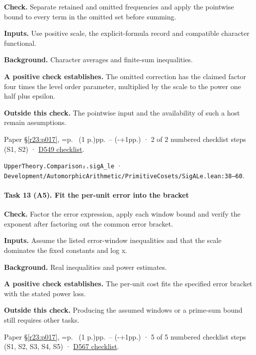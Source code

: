 \textbf{Check.} Separate retained and omitted frequencies and apply the pointwise bound to every term in the omitted set before summing.

\textbf{Inputs.} Use positive scale, the explicit-formula record and compatible character functional.

\textbf{Background.} Character averages and finite-sum inequalities.

\textbf{A positive check establishes.} The omitted correction has the claimed factor four times the level order parameter, multiplied by the scale to the power one half plus epsilon.

\textbf{Outside this check.} The pointwise input and the availability of such a host remain assumptions.

Paper \S\ref{r23:p017}, \ifnum{}=\relax p.\ \pageref{v5:d548-end} (1 p.)\else pp.\ \pageref{v5:d548-end}--\pageref{v5:chars-end} (\number\numexpr{}-+1\relax pp.)\fi{} · 2 of 2 numbered checklist steps (S1, S2) · \href{https://github.com/GunheeC/rh-lean-verification-atlas/blob/v0.1.0/units/D549.check.md}{D549 checklist}.

\nolinkurl{UpperTheory.Comparison₂.sigA_le} · \nolinkurl{Development/AutomorphicArithmetic/PrimitiveCosets/SigALe.lean:38–60}.

\paragraph{Task 13 (A5). Fit the per-unit error into the bracket}\label{v7:task-13}

\textbf{Check.} Factor the error expression, apply each window bound and verify the exponent after factoring out the common error bracket.

\textbf{Inputs.} Assume the listed error-window inequalities and that the scale dominates the fixed constants and log x.

\textbf{Background.} Real inequalities and power estimates.

\textbf{A positive check establishes.} The per-unit cost fits the specified error bracket with the stated power loss.

\textbf{Outside this check.} Producing the assumed windows or a prime-sum bound still requires other tasks.

Paper \S\ref{r23:p017}, \ifnum{}=\relax p.\ \pageref{r24:d567} (1 p.)\else pp.\ \pageref{r24:d567}--\pageref{v5:d567-end} (\number\numexpr{}-+1\relax pp.)\fi{} · 5 of 5 numbered checklist steps (S1, S2, S3, S4, S5) · \href{https://github.com/GunheeC/rh-lean-verification-atlas/blob/v0.1.0/units/D567.check.md}{D567 checklist}.

